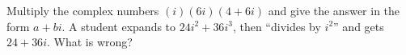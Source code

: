 Multiply the complex numbers $(i)(6i)(4+6i)$ and give the answer in the form $a+bi$. A student expands to $24i^2+36i^3$, then ``divides by $i^2$'' and gets $24+36i$. What is wrong?
